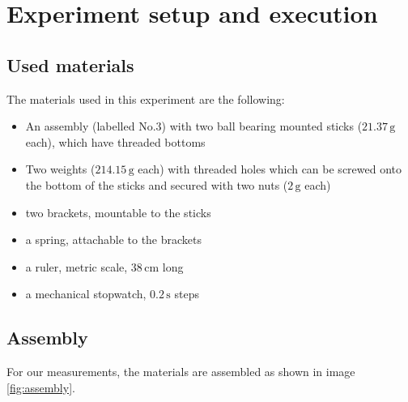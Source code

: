 \documentclass{scrreprt}
\newcommand{\unit}[1]{\ensuremath{\, \mathrm{#1}}}
\begin{document}
\section{Experiment setup and execution}

\subsection{Used materials}
The materials used in this experiment are the following:
\begin{itemize}
\item An assembly (labelled No.$3$) with two ball bearing mounted sticks ($21.37\unit{g}$ each), which have threaded bottoms
\item Two weights ($214.15 \unit{g}$ each) with threaded holes which can be screwed onto the bottom of the sticks and secured with two nuts ($2\unit{g}$ each)
\item two brackets, mountable to the sticks
\item a spring, attachable to the brackets 
\item a ruler, metric scale, $38 \unit{cm}$ long
\item a mechanical stopwatch, $0.2 \unit{s}$ steps
\end{itemize}

\subsection{Assembly}
For our measurements, the materials are assembled as shown in image \ref{fig:assembly}.
\end{document}
